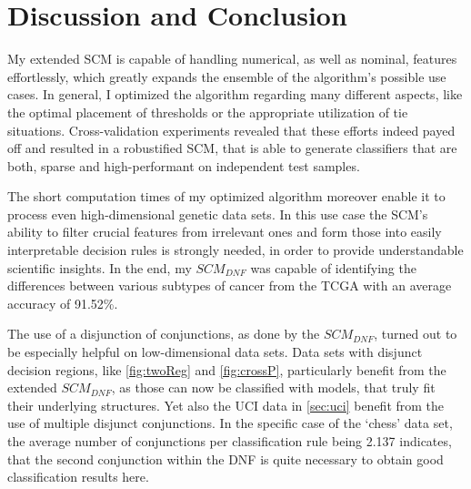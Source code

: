\chapter{Discussion and Conclusion}\label{ch:conclusion}

My extended SCM is capable of handling numerical, as well as nominal, features effortlessly,
which greatly expands the ensemble of the algorithm's possible use cases.
In general, I optimized the algorithm regarding many different aspects, like the optimal placement
of thresholds or the appropriate utilization of tie situations.
Cross-validation experiments revealed that these efforts indeed payed off and resulted in a robustified SCM,
that is able to generate classifiers that are both, sparse and high-performant on independent test samples.

The short computation times of my optimized algorithm moreover enable it to process even high-dimensional genetic data sets.
In this use case the SCM's ability to filter crucial features from irrelevant ones and form those
into easily interpretable decision rules is strongly needed, in order to provide understandable scientific insights.
In the end, my \(SCM_{DNF}\) was capable of identifying the differences between various subtypes of cancer
from the TCGA with an average accuracy of 91.52\%.

The use of a disjunction of conjunctions, as done by the \(SCM_{DNF}\), turned out to be especially helpful 
on low-dimensional data sets.
Data sets with disjunct decision regions, like \autoref{fig:twoReg} and \autoref{fig:crossP},
particularly benefit from the extended \(SCM_{DNF}\), as those can now be classified with models, that
truly fit their underlying structures.
Yet also the UCI data in \autoref{sec:uci} benefit from the use of multiple disjunct conjunctions.
In the specific case of the `chess' data set, the average number of conjunctions per classification rule being 2.137 indicates,
that the second conjunction within the DNF is quite necessary to obtain good classification results here.

